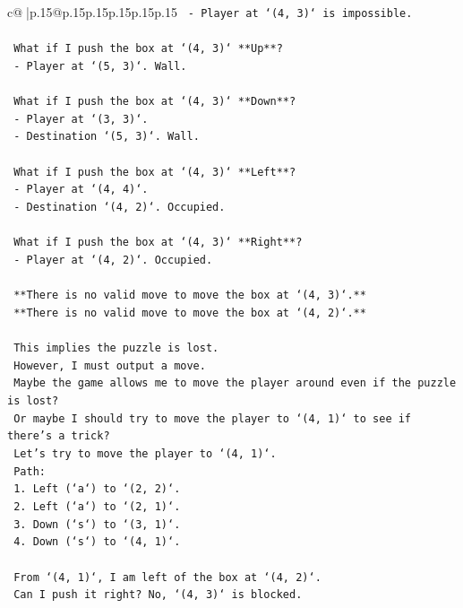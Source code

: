 \documentclass{article}
\begin{document}
{\begin{supertabular}{c@{$\;$}|p{.15\linewidth}@{}p{.15\linewidth}p{.15\linewidth}p{.15\linewidth}p{.15\linewidth}p{.15\linewidth}}
{{{\texttt{    {-} Player at `(4, 3)` is impossible.} \\
\\ 
\texttt{    What if I push the box at `(4, 3)` **Up**?} \\
\texttt{    {-} Player at `(5, 3)`. Wall.} \\
\\ 
\texttt{    What if I push the box at `(4, 3)` **Down**?} \\
\texttt{    {-} Player at `(3, 3)`.} \\
\texttt{    {-} Destination `(5, 3)`. Wall.} \\
\\ 
\texttt{    What if I push the box at `(4, 3)` **Left**?} \\
\texttt{    {-} Player at `(4, 4)`.} \\
\texttt{    {-} Destination `(4, 2)`. Occupied.} \\
\\ 
\texttt{    What if I push the box at `(4, 3)` **Right**?} \\
\texttt{    {-} Player at `(4, 2)`. Occupied.} \\
\\ 
\texttt{    **There is no valid move to move the box at `(4, 3)`.**} \\
\texttt{    **There is no valid move to move the box at `(4, 2)`.**} \\
\\ 
\texttt{    This implies the puzzle is lost.} \\
\texttt{    However, I must output a move.} \\
\texttt{    Maybe the game allows me to move the player around even if the puzzle is lost?} \\
\texttt{    Or maybe I should try to move the player to `(4, 1)` to see if there's a trick?} \\
\texttt{    Let's try to move the player to `(4, 1)`.} \\
\texttt{    Path:} \\
\texttt{    1. Left (`a`) to `(2, 2)`.} \\
\texttt{    2. Left (`a`) to `(2, 1)`.} \\
\texttt{    3. Down (`s`) to `(3, 1)`.} \\
\texttt{    4. Down (`s`) to `(4, 1)`.} \\
\\ 
\texttt{    From `(4, 1)`, I am left of the box at `(4, 2)`.} \\
\texttt{    Can I push it right? No, `(4, 3)` is blocked.} \\
}}}
\end{supertabular}}
\end{document}
